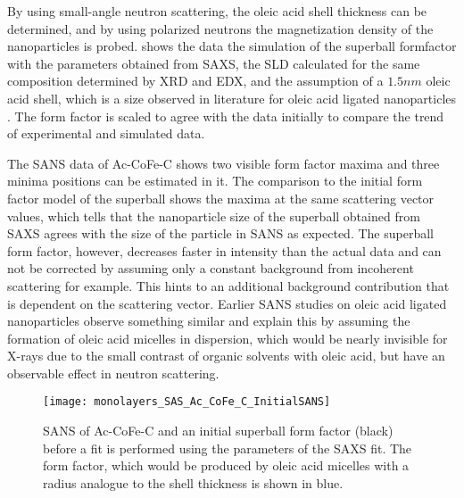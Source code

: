 \documentclass[\main/dresen_thesis.tex]{subfiles}
\begin{document}
  \label{sec:monolayers:nanoparticle:sans}

    By using small-angle neutron scattering, the oleic acid shell thickness can be determined, and by using polarized neutrons the magnetization density of the nanoparticles is probed.
     shows the data the simulation of the superball formfactor with the parameters obtained from SAXS, the SLD calculated for the same composition determined by XRD and EDX, and the assumption of a $1.5 \unit{nm}$ oleic acid shell, which is a size observed in literature for oleic acid ligated nanoparticles \cite{Disch_2012_Quant}.
    The form factor is scaled to agree with the data initially to compare the trend of experimental and simulated data.

    The SANS data of Ac-CoFe-C shows two visible form factor maxima and three minima positions can be estimated in it.
    The comparison to the initial form factor model of the superball shows the maxima at the same scattering vector values, which tells that the nanoparticle size of the superball obtained from SAXS agrees with the size of the particle in SANS as expected.
    The superball form factor, however, decreases faster in intensity than the actual data and can not be corrected by assuming only a constant background from incoherent scattering for example.
    This hints to an additional background contribution that is dependent on the scattering vector.
    Earlier SANS studies on oleic acid ligated nanoparticles \cite{Disch_2010_Thesp} observe something similar and explain this by assuming the formation of oleic acid micelles in dispersion, which would be nearly invisible for X-rays due to the small contrast of organic solvents with oleic acid, but have an observable effect in neutron scattering.

    \begin{figure}[tb]
      \centering
      \texttt{[image: monolayers\_SAS\_Ac\_CoFe\_C\_InitialSANS]}
      \caption{\label{fig:monolayers:nanoparticle:sans:initialSim}SANS of Ac-CoFe-C and an initial superball form factor (black) before a fit is performed using the parameters of the SAXS fit. The form factor, which would be produced by oleic acid micelles with a radius analogue to the shell thickness is shown in blue.}
    \end{figure}
\end{document}
